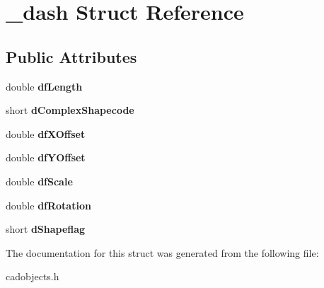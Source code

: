 \hypertarget{struct__dash}{}\section{\+\_\+dash Struct Reference}
\label{struct__dash}
\subsection*{Public Attributes}
\begin{DoxyCompactItemize}
\item 
double {\bfseries df\+Length}\hypertarget{struct__dash_af5c29cd0d82eab2b851225d46ee1a8e6}{}\label{struct__dash_af5c29cd0d82eab2b851225d46ee1a8e6}

\item 
short {\bfseries d\+Complex\+Shapecode}\hypertarget{struct__dash_a6c349cff69ac84a5d42841f692c9955f}{}\label{struct__dash_a6c349cff69ac84a5d42841f692c9955f}

\item 
double {\bfseries df\+X\+Offset}\hypertarget{struct__dash_afc530d590427ef170c13a98cb996219b}{}\label{struct__dash_afc530d590427ef170c13a98cb996219b}

\item 
double {\bfseries df\+Y\+Offset}\hypertarget{struct__dash_a49f61ebb106c8f5300252cfbd76f546e}{}\label{struct__dash_a49f61ebb106c8f5300252cfbd76f546e}

\item 
double {\bfseries df\+Scale}\hypertarget{struct__dash_ac719034a98b88385b83386a02f681523}{}\label{struct__dash_ac719034a98b88385b83386a02f681523}

\item 
double {\bfseries df\+Rotation}\hypertarget{struct__dash_a4a9dc2e074c3ea5b3a35b1bfee696610}{}\label{struct__dash_a4a9dc2e074c3ea5b3a35b1bfee696610}

\item 
short {\bfseries d\+Shapeflag}\hypertarget{struct__dash_a658a6c09aed4bfe650483009c4eaf782}{}\label{struct__dash_a658a6c09aed4bfe650483009c4eaf782}

\end{DoxyCompactItemize}


The documentation for this struct was generated from the following file\+:\begin{DoxyCompactItemize}
\item 
cadobjects.\+h\end{DoxyCompactItemize}
